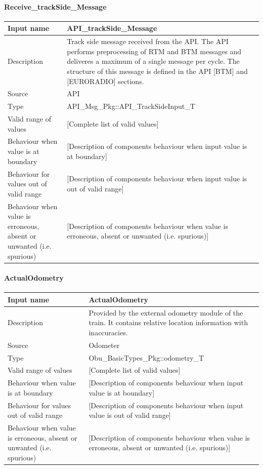 \paragraph{Receive\_trackSide\_Message}

\begin{longtable}{p{}p{}}
\toprule
Input name				& API\_trackSide\_Message \\
\midrule
Description				& Track side message received from the API. The API performs preprocessing of RTM and BTM messages and deliveres a maximum of a single message per cycle. The structure of this message is defined in the API [BTM] and [EURORADIO] sections.\\
\midrule
Source					& API \\ 
\midrule
Type					& API\_Msg\_Pkg::API\_TrackSideInput\_T \\
\midrule
Valid range of values	& [Complete list of valid values] \\
\midrule
Behaviour when value is at boundary	& [Description of components behaviour when input value is at boundary] \\
\midrule
Behaviour for values out of valid range	& [Description of components behaviour when input value is out of valid range] \\
\midrule
Behaviour when value is erroneous, absent or unwanted (i.e. spurious) & [Description of components behaviour when value is erroneous, absent or unwanted (i.e. spurious)] \\
\bottomrule
\end{longtable}


\paragraph{ActualOdometry}

\begin{longtable}{p{}p{}}
\toprule
Input name				& ActualOdometry \\
\midrule
Description				& Provided by the external odometry module of the train. It contains relative location information with inaccuracies. \\
\midrule
Source					& Odometer \\ 
\midrule
Type					& Obu\_BasicTypes\_Pkg::odometry\_T \\
\midrule
Valid range of values	& [Complete list of valid values] \\
\midrule
Behaviour when value is at boundary	& [Description of components behaviour when input value is at boundary] \\
\midrule
Behaviour for values out of valid range	& [Description of components behaviour when input value is out of valid range] \\
\midrule
Behaviour when value is erroneous, absent or unwanted (i.e. spurious) & [Description of components behaviour when value is erroneous, absent or unwanted (i.e. spurious)] \\
\bottomrule
\end{longtable}

